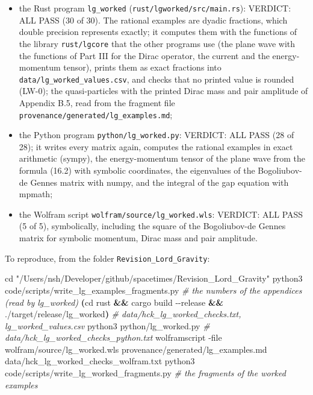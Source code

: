 \documentclass[
  10pt,
]{article}
\newenvironment{Shaded}{}{}
\newcommand{\AttributeTok}[1]{\textcolor[rgb]{0.49,0.56,0.16}{#1}}
\newcommand{\BuiltInTok}[1]{\textcolor[rgb]{0.00,0.50,0.00}{#1}}
\newcommand{\CommentTok}[1]{\textcolor[rgb]{0.38,0.63,0.69}{\textit{#1}}}
\newcommand{\ExtensionTok}[1]{#1}
\newcommand{\KeywordTok}[1]{\textcolor[rgb]{0.00,0.44,0.13}{\textbf{#1}}}
\newcommand{\NormalTok}[1]{#1}
\newcommand{\StringTok}[1]{\textcolor[rgb]{0.25,0.44,0.63}{#1}}
\providecommand{\tightlist}{%
  \setlength{\itemsep}{0pt}\setlength{\parskip}{0pt}}
\begin{document}
\begin{itemize}
\tightlist
\item
  the Rust program \texttt{lg\_worked}
  (\texttt{rust/lgworked/src/main.rs}): VERDICT: ALL PASS (30 of 30).
  The rational examples are dyadic fractions, which double precision
  represents exactly; it computes them with the functions of the library
  \texttt{rust/lgcore} that the other programs use (the plane wave with
  the functions of Part III for the Dirac operator, the current and the
  energy-momentum tensor), prints them as exact fractions into
  \texttt{data/lg\_worked\_values.csv}, and checks that no printed value
  is rounded (LW-0); the quasi-particles with the printed Dirac mass and
  pair amplitude of Appendix B.5, read from the fragment file
  \texttt{provenance/generated/lg\_examples.md};
\item
  the Python program \texttt{python/lg\_worked.py}: VERDICT: ALL PASS
  (28 of 28); it writes every matrix again, computes the rational
  examples in exact arithmetic (sympy), the energy-momentum tensor of
  the plane wave from the formula (16.2) with symbolic coordinates, the
  eigenvalues of the Bogoliubov-de Gennes matrix with numpy, and the
  integral of the gap equation with mpmath;
\item
  the Wolfram script \texttt{wolfram/source/lg\_worked.wls}: VERDICT:
  ALL PASS (5 of 5), symbolically, including the square of the
  Bogoliubov-de Gennes matrix for symbolic momentum, Dirac mass and pair
  amplitude.
\end{itemize}

To reproduce, from the folder \texttt{Revision\_Lord\_Gravity}:

\begin{Shaded}
\begin{Highlighting}[]
\BuiltInTok{cd} \StringTok{"/Users/nsh/Developer/github/spacetimes/Revision\_Lord\_Gravity"}
\ExtensionTok{python3}\NormalTok{ code/scripts/write\_lg\_examples\_fragments.py               }\CommentTok{\# the numbers of the appendices (read by lg\_worked)}
\KeywordTok{(}\BuiltInTok{cd}\NormalTok{ rust }\KeywordTok{\&\&} \ExtensionTok{cargo}\NormalTok{ build }\AttributeTok{{-}{-}release} \KeywordTok{\&\&} \ExtensionTok{./target/release/lg\_worked}\KeywordTok{)} \CommentTok{\# data/hck\_lg\_worked\_checks.txt, lg\_worked\_values.csv}
\ExtensionTok{python3}\NormalTok{ python/lg\_worked.py                                       }\CommentTok{\# data/hck\_lg\_worked\_checks\_python.txt}
\ExtensionTok{wolframscript} \AttributeTok{{-}file}\NormalTok{ wolfram/source/lg\_worked.wls provenance/generated/lg\_examples.md data/hck\_lg\_worked\_checks\_wolfram.txt}
\ExtensionTok{python3}\NormalTok{ code/scripts/write\_lg\_worked\_fragments.py                }\CommentTok{\# the fragments of the worked examples}
\end{Highlighting}
\end{Shaded}
\end{document}
